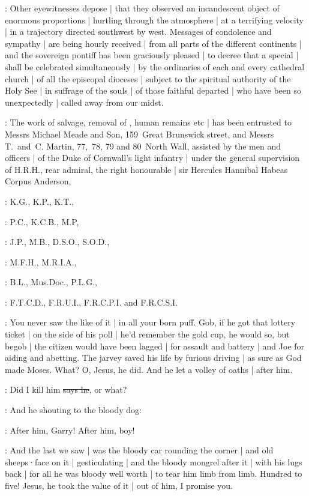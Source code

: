 :
Other eyewitnesses depose |
that they observed an incandescent object of enormous proportions
 |
hurtling through the atmosphere |
at a terrifying velocity |
in a trajectory directed southwest by west.
Messages of condolence and sympathy |
are being hourly received |
from all parts of the different continents |
and the sovereign pontiff has been graciously pleased |
to decree that a special  |
shall be celebrated simultaneously |
by the ordinaries of each and every cathedral church |
of all the episcopal dioceses |
subject to the spiritual authority of the Holy See |
in suffrage of the souls |
of those faithful departed |
who have been so unexpectedly |
called away from our midst.

:
The work of salvage,
removal of ,
human remains etc |
has been entrusted to Messrs Michael Meade and Son,
159~Great Brunswick street,
and Messrs T.~and~C. Martin,
77,~78, 79 and 80~North Wall,
assisted by the men and officers |
of the Duke of Cornwall's light infantry |
under the general supervision of H.R.H.,
rear admiral,
the right honourable |
sir Hercules Hannibal Habeas Corpus Anderson,

:
K.G.,
K.P.,
K.T.,

:
P.C.,
K.C.B.,
M.P,

:
J.P.,
M.B.,
D.S.O.,
S.O.D.,

:
M.F.H.,
M.R.I.A.,

:
B.L.,
Mus.Doc.,
P.L.G.,

:
F.T.C.D.,
F.R.U.I.,
F.R.C.P.I.
and F.R.C.S.I.

\Nq:
You never saw the like of it |
in all your born puff.
Gob,
if he got that lottery ticket |
on the side of his poll |
he'd remember the gold cup,
he would so,
but begob |
the citizen would have been lagged |
for assault and battery |
and Joe for aiding and abetting.
The jarvey saved his life by furious driving |
as sure as God made Moses.
What?
O, Jesus,
he did.
And he let a volley of oaths |
after him.

\citizen:
Did I kill him
\sout{says he},
or what?

\Nq:
And he shouting to the bloody dog:

\citizen:
After him,
Garry!
After him,
boy!

\Nq:
And the last we saw |
was the bloody car rounding the corner |
and old sheeps·face on it |
gesticulating |
and the bloody mongrel after it |
with his lugs back |
for all he was bloody well worth |
to tear him limb from limb.
Hundred to five!
Jesus,
he took the value of it |
out of him,
I promise you.

